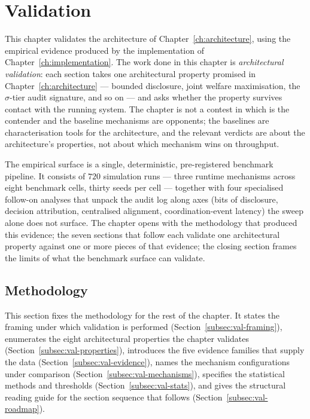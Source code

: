 \chapter{Validation}
\label{ch:results}

This chapter validates the \NEXUS{} architecture of
Chapter~\ref{ch:architecture}, using the empirical evidence produced
by the implementation of Chapter~\ref{ch:implementation}. The work
done in this chapter is \emph{architectural validation}: each section
takes one architectural property promised in Chapter~\ref{ch:architecture}
--- bounded disclosure, joint welfare maximisation, the
$\sigma$-tier audit signature, and so on --- and asks whether the
property survives contact with the running system. The chapter is
not a contest in which \NEXUS{} is the contender and the baseline
mechanisms are opponents; the baselines are characterisation tools
for the architecture, and the relevant verdicts are about the
architecture's properties, not about which mechanism wins on
throughput.

The empirical surface is a single, deterministic, pre-registered
benchmark pipeline. It consists of $720$ simulation runs --- three
runtime mechanisms across eight benchmark cells, thirty seeds per
cell --- together with four specialised follow-on analyses that
unpack the audit log along axes (bits of disclosure, decision
attribution, centralised alignment, coordination-event latency) the
sweep alone does not surface. The chapter opens with the methodology
that produced this evidence; the seven sections that follow each
validate one architectural property against one or more pieces of
that evidence; the closing section frames the limits of what the
benchmark surface can validate.

\section{Methodology}
\label{sec:val-methodology}

This section fixes the methodology for the rest of the chapter. It
states the framing under which validation is performed
(Section~\ref{subsec:val-framing}), enumerates the eight architectural
properties the chapter validates (Section~\ref{subsec:val-properties}),
introduces the five evidence families that supply the data
(Section~\ref{subsec:val-evidence}), names the mechanism configurations
under comparison (Section~\ref{subsec:val-mechanisms}), specifies the
statistical methods and thresholds (Section~\ref{subsec:val-stats}),
and gives the structural reading guide for the section sequence that
follows (Section~\ref{subsec:val-roadmap}).

